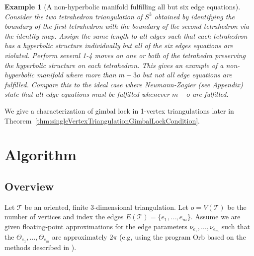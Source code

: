 \documentclass[utopia,fullpage]{nmd/article}
\newcommand{\negSpace}{\!}
\newtheorem{example}[theorem]{Example}
\newcommand{\negSpace}{}
\newcommand\trig{\mathcal{T}}
\begin{document}
\begin{example}[A non-hyperbolic manifold fulfilling all but six edge equations]
Consider the two tetrahedron triangulation of $S^3$ obtained by identifying the boundary of the first tetrahedron with the boundary of the second tetrahedron via the identity map. Assign the same length to all edges such that each tetrahedron has a hyperbolic structure individually but all of the six edges equations are violated. Perform several 1-4 moves on one or both of the tetrahedra preserving the hyperbolic structure on each tetrahedron. This gives an example of a non-hyperbolic manifold where more than $m-3o$ but not all edge equations are fulfilled. Compare this to the ideal case where Neumann-Zagier (see Appendix) state that all edge equations must be fulfilled whenever $m-o$ are fulfilled.
\end{example}

We give a characterization of gimbal lock in 1-vertex triangulations later in Theorem~\ref{thm:singleVertexTriangulationGimbalLockCondition}.

\section{Algorithm} \label{sec:algo}

\subsection{Overview}

Let $\trig$\negSpace{} be an oriented, finite 3-dimensional triangulation. Let $o=V(\trig)$ be the number of vertices and index the edges $E(\trig)=\{e_1,\dots,e_m\}$.
Assume we are given floating-point approximations for the edge parameters $\nu_{e_1},\dots,\nu_{e_m}$ such that the $\Theta_{e_1}, \dots, \Theta_{e_m}$ are approximately $2\pi$ (e.g, using the program Orb \cite{orb} based on the methods described in \cite[Section~2.2]{heardThesis}).
\end{document}
